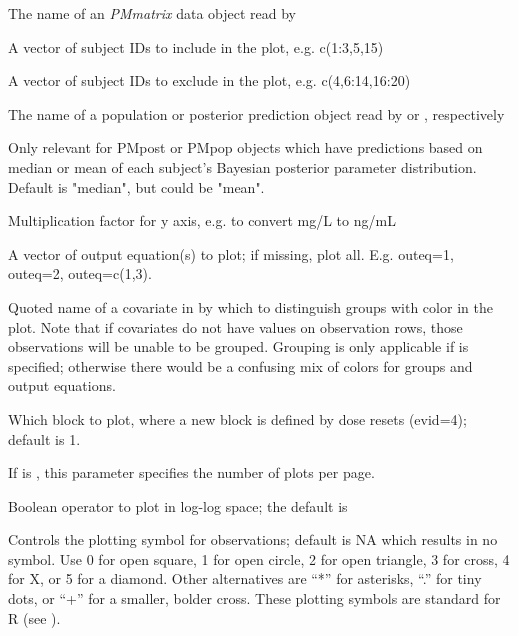 \documentclass[a4paper]{book}
\begin{document}
%
\begin{Arguments}
\begin{ldescription}
\item[\code{x}] The name of an \emph{PMmatrix} data object read by 

\item[\code{include}] A vector of subject IDs to include in the plot, e.g. c(1:3,5,15)

\item[\code{exclude}] A vector of subject IDs to exclude in the plot, e.g. c(4,6:14,16:20)

\item[\code{pred}] The name of a population or posterior prediction object read by  or 
, respectively

\item[\code{icen}] Only relevant for PMpost or PMpop objects which have predictions based on median or mean of each
subject's Bayesian posterior parameter distribution.  Default is "median", but could be "mean".

\item[\code{mult}] Multiplication factor for y axis, e.g. to convert mg/L to ng/mL

\item[\code{outeq}] A vector of output equation(s) to plot; if missing, plot all.  E.g. outeq=1, outeq=2, outeq=c(1,3).

\item[\code{group}] Quoted name of a covariate in  by which
to distinguish groups with color in the plot. Note that if covariates do not have values on observation
rows, those observations will be unable to be grouped.  Grouping is only applicable if  is
specified; otherwise there would be a confusing mix of colors for groups and output equations.

\item[\code{block}] Which block to plot, where a new block is defined by dose resets (evid=4); default is 1.

\item[\code{layout}] If  is , this parameter specifies the number of plots per page.

\item[\code{log}] Boolean operator to plot in log-log space; the default is 

\item[\code{pch}] Controls the plotting symbol for observations; default is NA which results in no symbol.
Use 0 for open square, 1 for open circle, 2 for open triangle, 3 for cross, 4 for X, or 5 for a diamond.
Other alternatives are ``*'' for asterisks, ``.'' for tiny dots, or ``+'' for a smaller,
bolder cross.  These plotting symbols are standard for R (see ).


\end{ldescription}
\end{Arguments}
\end{document}
